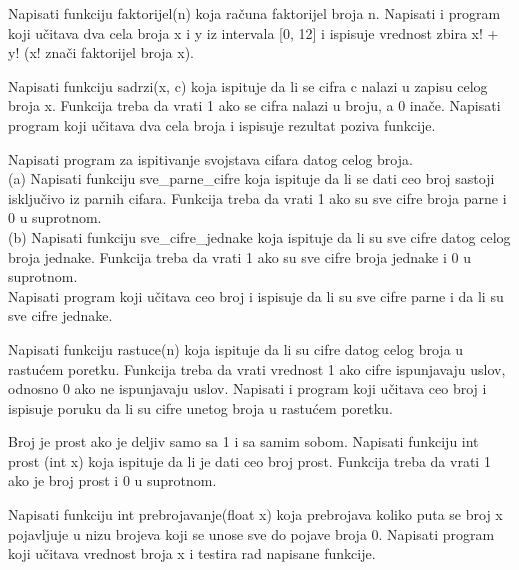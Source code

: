 \begin{primer}
Napisati funkciju faktorijel(n) koja računa
faktorijel broja n. Napisati i program koji učitava dva cela broja x i y iz intervala
[0, 12] i ispisuje vrednost zbira x! + y! (x! znači faktorijel broja x).
\end{primer}

\begin{primer}
Napisati funkciju sadrzi(x, c) koja ispituje
da li se cifra c nalazi u zapisu celog broja x. Funkcija treba da vrati 1 ako se cifra
nalazi u broju, a 0 inače. Napisati program koji učitava dva cela broja i ispisuje
rezultat poziva funkcije.
\end{primer}

\begin{primer}
Napisati program za ispitivanje svojstava cifara datog celog
broja.\\
(a) Napisati funkciju sve\_parne\_cifre koja ispituje da li se dati ceo broj sastoji
isključivo iz parnih cifara. Funkcija treba da vrati 1 ako su sve cifre
broja parne i 0 u suprotnom.\\
(b) Napisati funkciju sve\_cifre\_jednake koja ispituje da li su sve cifre datog
celog broja jednake. Funkcija treba da vrati 1 ako su sve cifre broja jednake
i 0 u suprotnom.\\
Napisati program koji učitava ceo broj i ispisuje da li su sve cifre parne i da li su
sve cifre jednake.
\end{primer}

\begin{primer}
Napisati funkciju rastuce(n) koja ispituje da li
su cifre datog celog broja u rastućem poretku. Funkcija treba da vrati vrednost
1 ako cifre ispunjavaju uslov, odnosno 0 ako ne ispunjavaju uslov. Napisati i
program koji učitava ceo broj i ispisuje poruku da li su cifre unetog broja u
rastućem poretku.
\end{primer}

\begin{primer}
Broj je prost ako je deljiv samo sa 1 i sa samim sobom.
Napisati funkciju int prost (int x) koja ispituje da li je dati ceo broj prost.
Funkcija treba da vrati 1 ako je broj prost i 0 u suprotnom. 
\end{primer}

\begin{primer}
Napisati funkciju int prebrojavanje(float x) koja prebrojava
koliko puta se broj x pojavljuje u nizu brojeva koji se unose sve do pojave
broja 0. Napisati program koji učitava vrednost broja x i testira rad napisane
funkcije.
\end{primer}



